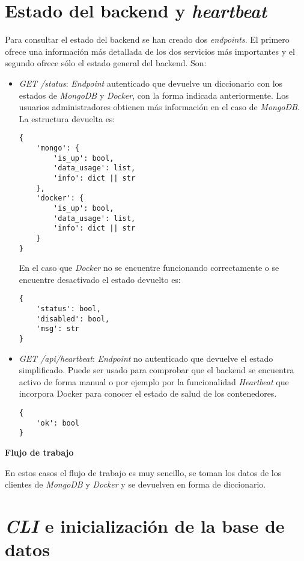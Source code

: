 \section{Estado del backend y \textit{heartbeat}}


Para consultar el estado del backend se han creado dos \textit{endpoints}. El primero ofrece una información más detallada de los dos servicios más importantes y el segundo ofrece sólo el estado general del backend. Son:
\begin{itemize}
	\item \textit{GET /status}: \textit{Endpoint} autenticado que devuelve un diccionario con los estados de \textit{MongoDB} y \textit{Docker}, con la forma indicada anteriormente. Los usuarios administradores obtienen más información en el caso de \textit{MongoDB}. La estructura devuelta es:

\begin{lstlisting}
{
	'mongo': {
		'is_up': bool,
		'data_usage': list,
		'info': dict || str
	},
	'docker': {
		'is_up': bool,
		'data_usage': list,
		'info': dict || str
	}
}
\end{lstlisting}

\bigskip	
En el caso que \textit{Docker} no se encuentre funcionando correctamente o se encuentre desactivado el estado devuelto es:
	
\begin{lstlisting}
{
	'status': bool,
	'disabled': bool,
	'msg': str
}
\end{lstlisting}
	
	\item \textit{GET /api/heartbeat}: \textit{Endpoint} no autenticado que devuelve el estado simplificado. Puede ser usado para comprobar que el backend se encuentra activo de forma manual o por ejemplo por la funcionalidad \textit{Heartbeat} que incorpora Docker para conocer el estado de salud de los contenedores.
	
\begin{lstlisting}
{
	'ok': bool
}
\end{lstlisting}
\end{itemize}

\bigskip
\textbf{Flujo de trabajo}

En estos casos el flujo de trabajo es muy sencillo, se toman los datos de los clientes de \textit{MongoDB} y \textit{Docker} y se devuelven en forma de diccionario.


\section{\textit{CLI} e inicialización de la base de datos}


